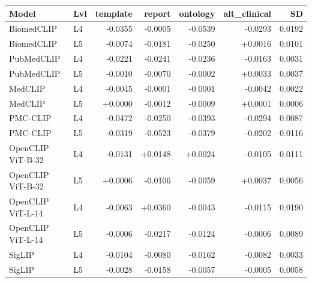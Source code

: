\begin{tabular}{llrrrrr}
\toprule
Model & Lvl & template & report & ontology & alt_clinical & SD \\
\midrule
BiomedCLIP & L4 & -0.0355 & -0.0005 & -0.0539 & -0.0293 & 0.0192 \\
BiomedCLIP & L5 & -0.0074 & -0.0181 & -0.0250 & +0.0016 & 0.0101 \\
PubMedCLIP & L4 & -0.0221 & -0.0241 & -0.0236 & -0.0163 & 0.0031 \\
PubMedCLIP & L5 & -0.0010 & -0.0070 & -0.0002 & +0.0033 & 0.0037 \\
MedCLIP & L4 & -0.0045 & -0.0001 & -0.0001 & -0.0042 & 0.0022 \\
MedCLIP & L5 & +0.0000 & -0.0012 & -0.0009 & +0.0001 & 0.0006 \\
PMC-CLIP & L4 & -0.0472 & -0.0250 & -0.0393 & -0.0294 & 0.0087 \\
PMC-CLIP & L5 & -0.0319 & -0.0523 & -0.0379 & -0.0202 & 0.0116 \\
OpenCLIP ViT-B-32 & L4 & -0.0131 & +0.0148 & +0.0024 & -0.0105 & 0.0111 \\
OpenCLIP ViT-B-32 & L5 & +0.0006 & -0.0106 & -0.0059 & +0.0037 & 0.0056 \\
OpenCLIP ViT-L-14 & L4 & -0.0063 & +0.0360 & -0.0043 & -0.0115 & 0.0190 \\
OpenCLIP ViT-L-14 & L5 & -0.0006 & -0.0217 & -0.0124 & -0.0006 & 0.0089 \\
SigLIP & L4 & -0.0104 & -0.0080 & -0.0162 & -0.0082 & 0.0033 \\
SigLIP & L5 & -0.0028 & -0.0158 & -0.0057 & -0.0005 & 0.0058 \\
\bottomrule
\end{tabular}
